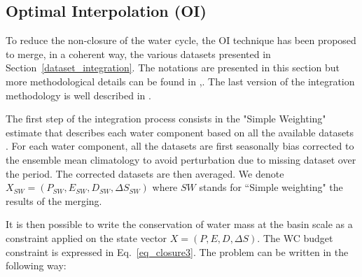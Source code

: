 \documentclass[draft]{agujournal2019}
\begin{document}
\subsection{Optimal Interpolation (OI)}
To reduce the non-closure of the water cycle, the OI technique has been proposed to merge, in a coherent way, the various datasets presented in Section~\ref{dataset_integration}. 
The notations are presented in this section but more methodological details can be found in \cite{Aires2014a},. 
The last version of the integration methodology is well described in \cite{Pellet2019a}. 

The first step of the integration process consists in the "Simple Weighting" estimate that describes each water component based on all the available datasets \cite{Aires2014}. 
For each water component, all the datasets are first seasonally bias corrected to the ensemble mean climatology to avoid perturbation due to missing dataset over the period. 
The corrected datasets are then averaged. We denote $X_{SW} = (P_{SW}, E_{SW}, D_{SW}, \Delta S_{SW})$ where $SW$ stands for ``Simple weighting" the results of the merging.

It is then possible to write the conservation of water mass at the basin scale as a constraint applied on the state vector $X = (P, E, D, \Delta S)$. 
The WC budget constraint is expressed in Eq.~\ref{eq_closure3}. 
The problem can be written in the following way:
\end{document}
